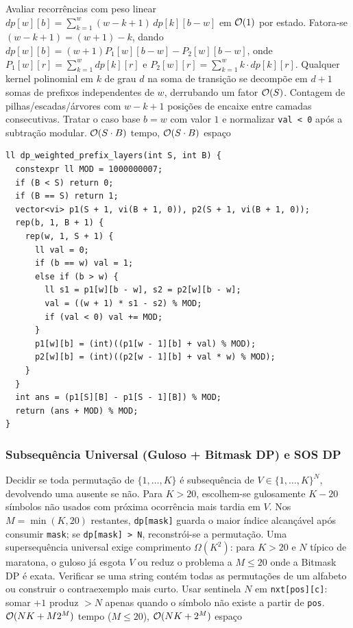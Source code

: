 \algobox
  {Avaliar recorrências com peso linear $dp[w][b] = \sum_{k=1}^{w} (w - k + 1)\, dp[k][b - w]$ em $\mathcal{O}(1)$ por estado.}
  {Fatora-se $(w - k + 1) = (w + 1) - k$, dando $dp[w][b] = (w + 1) P_1[w][b - w] - P_2[w][b - w]$, onde $P_1[w][r] = \sum_{k=1}^w dp[k][r]$ e $P_2[w][r] = \sum_{k=1}^w k \cdot dp[k][r]$.}
  {Qualquer kernel polinomial em $k$ de grau $d$ na soma de transição se decompõe em $d + 1$ somas de prefixos independentes de $w$, derrubando um fator $\mathcal{O}(S)$.}
  {Contagem de pilhas/escadas/árvores com $w - k + 1$ posições de encaixe entre camadas consecutivas.}
  {Tratar o caso base $b = w$ com valor $1$ e normalizar \texttt{val < 0} após a subtração modular.}
  {$\mathcal{O}(S \cdot B)$ tempo, $\mathcal{O}(S \cdot B)$ espaço}

\begin{lstlisting}
ll dp_weighted_prefix_layers(int S, int B) {
  constexpr ll MOD = 1000000007;
  if (B < S) return 0;
  if (B == S) return 1;
  vector<vi> p1(S + 1, vi(B + 1, 0)), p2(S + 1, vi(B + 1, 0));
  rep(b, 1, B + 1) {
    rep(w, 1, S + 1) {
      ll val = 0;
      if (b == w) val = 1;
      else if (b > w) {
        ll s1 = p1[w][b - w], s2 = p2[w][b - w];
        val = ((w + 1) * s1 - s2) % MOD;
        if (val < 0) val += MOD;
      }
      p1[w][b] = (int)((p1[w - 1][b] + val) % MOD);
      p2[w][b] = (int)((p2[w - 1][b] + val * w) % MOD);
    }
  }
  int ans = (p1[S][B] - p1[S - 1][B]) % MOD;
  return (ans + MOD) % MOD;
}
\end{lstlisting}

\subsubsection{Subsequência Universal (Guloso + Bitmask DP) e SOS DP}
\algobox
  {Decidir se toda permutação de $\{1, \dots, K\}$ é subsequência de $V \in \{1, \dots, K\}^N$, devolvendo uma ausente se não.}
  {Para $K > 20$, escolhem-se gulosamente $K - 20$ símbolos não usados com próxima ocorrência mais tardia em $V$. Nos $M = \min(K, 20)$ restantes, \texttt{dp[mask]} guarda o maior índice alcançável após consumir \texttt{mask}; se \texttt{dp[mask] > N}, reconstrói-se a permutação.}
  {Uma supersequência universal exige comprimento $\Omega(K^2)$: para $K > 20$ e $N$ típico de maratona, o guloso já esgota $V$ ou reduz o problema a $M \le 20$ onde a Bitmask DP é exata.}
  {Verificar se uma string contém todas as permutações de um alfabeto ou construir o contraexemplo mais curto.}
  {Usar sentinela $N$ em \texttt{nxt[pos][c]}: somar $+1$ produz $> N$ apenas quando o símbolo não existe a partir de \texttt{pos}.}
  {$\mathcal{O}(N K + M 2^M)$ tempo ($M \le 20$), $\mathcal{O}(N K + 2^M)$ espaço}

